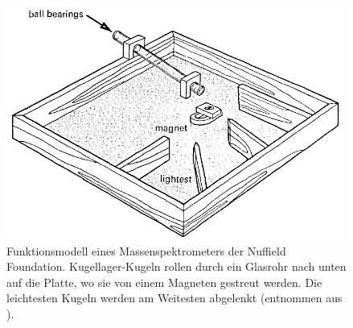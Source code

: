 \begin{figure}[htbp]
\centering
 \includegraphics[width=0.99\textwidth]{images/nuffield.png}
  \caption[Funktionsmodell eines Massenspektrometers der Nuffield Foundation]{Funktionsmodell eines Massenspektrometers der Nuffield Foundation. Kugellager-Kugeln rollen durch ein Glasrohr nach unten auf die Platte, wo sie von einem Magneten gestreut werden. Die leichtesten Kugeln werden am Weitesten abgelenkt (entnommen aus \cite[S\,262]{Nuffield1970}).}
  \label{fig:nuffsaid}
  \vspace{-0pt}
\end{figure}
